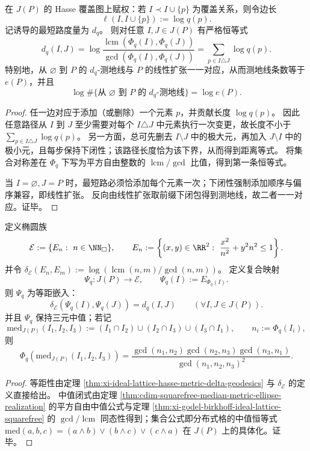 \begin{theorem}\label{thm:xi-ideal-lattice-hasse-metric-delta-geodesics}
在 \(J(P)\) 的 Hasse 覆盖图上赋权：若 \(I\prec I\cup\{p\}\) 为覆盖关系，则令边长
\[
\ell(I,I\cup\{p\}):=\log q(p).
\]
记诱导的最短路度量为 \(d_q\)。
则对任意 \(I,J\in J(P)\) 有严格恒等式
\[
d_q(I,J)
=
\log\!\frac{\operatorname{lcm}(\Phi_q(I),\Phi_q(J))}{\gcd(\Phi_q(I),\Phi_q(J))}
=
\sum_{p\in I\triangle J}\log q(p).
\]
特别地，从 \(\varnothing\) 到 \(P\) 的 \(d_q\)-测地线与 \(P\) 的线性扩张一一对应，从而测地线条数等于 \(e(P)\)，并且
\[
\log\#\{\text{从 }\varnothing\text{ 到 }P\text{ 的 }d_q\text{-测地线}\}=\log e(P).
\]
\end{theorem}
\begin{proof}
任一边对应于添加（或删除）一个元素 \(p\)，并贡献长度 \(\log q(p)\)。
因此任意路径从 \(I\) 到 \(J\) 至少需要对每个 \(I\triangle J\) 中元素执行一次变更，故长度不小于 \(\sum_{p\in I\triangle J}\log q(p)\)。
另一方面，总可先删去 \(I\setminus J\) 中的极大元，再加入 \(J\setminus I\) 中的极小元，且每步保持下闭性；该路径长度恰为该下界，从而得到距离等式。
将集合对称差在 \(\Phi_q\) 下写为平方自由整数的 \(\operatorname{lcm}/\gcd\) 比值，得到第一条恒等式。

当 \(I=\varnothing,J=P\) 时，最短路必须恰添加每个元素一次；下闭性强制添加顺序与偏序兼容，即线性扩张。
反向由线性扩张取前缀下闭包得到测地线，故二者一一对应。证毕。
\end{proof}

\begin{theorem}[平方自由账本到椭圆族的等距中值实现]\label{thm:xi-ideal-lattice-ellipse-median-realization}
定义椭圆族
\[
\mathcal E:=\{E_n:\ n\in\NN_{\square}\},
\qquad
E_n:=\left\{(x,y)\in\RR^2:\ \frac{x^2}{n^2}+y^2n^2\le 1\right\}.
\]
并令 \(\delta_{\mathcal E}(E_n,E_m):=\log(\operatorname{lcm}(n,m)/\gcd(n,m))\)。
定义复合映射
\[
\Psi_q:J(P)\to\mathcal E,\qquad \Psi_q(I):=E_{\Phi_q(I)}.
\]
则 \(\Psi_q\) 为等距嵌入：
\[
\delta_{\mathcal E}(\Psi_q(I),\Psi_q(J))=d_q(I,J)\qquad(\forall I,J\in J(P)).
\]
并且 \(\Psi_q\) 保持三元中值；若记
\[
\mathrm{med}_{J(P)}(I_1,I_2,I_3):=(I_1\cap I_2)\cup(I_2\cap I_3)\cup(I_3\cap I_1),
\qquad n_i:=\Phi_q(I_i),
\]
则
\[
\Phi_q(\mathrm{med}_{J(P)}(I_1,I_2,I_3))
=
\frac{\gcd(n_1,n_2)\gcd(n_2,n_3)\gcd(n_3,n_1)}{\gcd(n_1,n_2,n_3)^2}.
\]
\end{theorem}
\begin{proof}
等距性由定理 \ref{thm:xi-ideal-lattice-hasse-metric-delta-geodesics} 与 \(\delta_{\mathcal E}\) 的定义直接给出。
中值闭式由定理 \ref{thm:cdim-squarefree-median-metric-ellipse-realization} 的平方自由中值公式与定理 \ref{thm:xi-godel-birkhoff-ideal-lattice-squarefree} 的 \(\gcd/\operatorname{lcm}\) 同态性得到；集合公式即分布式格的中值恒等式
\(
\mathrm{med}(a,b,c)=(a\wedge b)\vee(b\wedge c)\vee(c\wedge a)
\)
在 \(J(P)\) 上的具体化。证毕。
\end{proof}

